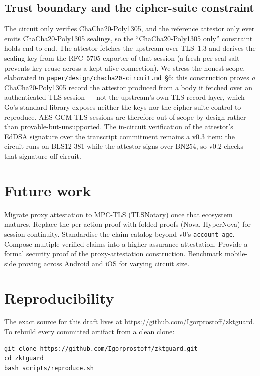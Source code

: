 \documentclass[11pt,a4paper]{article}
\begin{document}
\subsection{Trust boundary and the cipher-suite constraint}

The circuit only verifies ChaCha20-Poly1305, and the reference
attestor only ever emits ChaCha20-Poly1305 sealings, so the
``ChaCha20-Poly1305 only'' constraint holds end to end. The attestor
fetches the upstream over TLS~1.3 and derives the sealing key from
the RFC~5705 exporter of that session (a fresh per-seal salt prevents
key reuse across a kept-alive connection). We stress the honest
scope, elaborated in \texttt{paper/design/chacha20-circuit.md}~\S6:
this construction proves \emph{a} ChaCha20-Poly1305 record the
attestor produced from a body it fetched over an authenticated TLS
session --- not the upstream's own TLS record layer, which Go's
standard library exposes neither the keys nor the cipher-suite
control to reproduce. AES-GCM TLS sessions are therefore out of scope
by design rather than provable-but-unsupported. The in-circuit
verification of the attestor's EdDSA signature over the transcript
commitment remains a v0.3 item: the circuit runs on BLS12-381 while
the attestor signs over BN254, so v0.2 checks that signature
off-circuit.

\section{Future work}\label{sec:future}

Migrate proxy attestation to MPC-TLS (TLSNotary) once that ecosystem
matures. Replace the per-action proof with folded proofs (Nova,
HyperNova) for session continuity. Standardise the claim catalog
beyond v0's \texttt{account\_age}. Compose multiple verified claims
into a higher-assurance attestation. Provide a formal security proof
of the proxy-attestation construction. Benchmark mobile-side proving
across Android and iOS for varying circuit size.

\appendix
\section{Reproducibility}\label{app:repro}

The exact source for this draft lives at
\url{https://github.com/Igorprostoff/zktguard}. To rebuild every
committed artifact from a clean clone:

\begin{verbatim}
git clone https://github.com/Igorprostoff/zktguard.git
cd zktguard
bash scripts/reproduce.sh
\end{verbatim}
\end{document}
